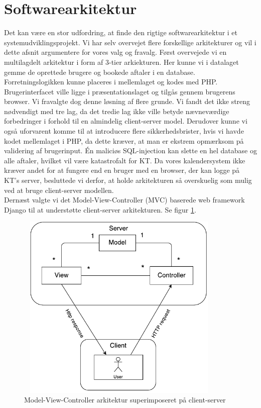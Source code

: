 \documentclass[12pt]{article}   %
\begin{document}
\section{Softwarearkitektur}
Det kan være en stor udfordring, at finde den rigtige softwarearkitektur i et
systemudviklingsprojekt. Vi har selv overvejet flere forskellige arkitekturer 
og vil i dette afsnit argumentere for vores valg og fravalg. Først overvejede
vi en multilagdelt arkitektur i form af 3-tier arkiekturen. Her kunne vi i
datalaget gemme de oprettede brugere og bookede aftaler i en database.
Forretningslogikken kunne placeres i mellemlaget og kodes med PHP.
Brugerinterfacet ville ligge i præsentationslaget og tilgås gennem brugerens
browser. Vi fravalgte dog denne løsning af flere grunde. Vi fandt det ikke
streng nødvendigt med tre lag, da det tredie lag ikke ville betyde
nævneværdige forbedringer i forhold til en almindelig client-server model.
Derudover kunne vi også uforvarent komme til at introducere flere
sikkerhedsbrister, hvis vi havde kodet mellemlaget i PHP, da dette kræver, at 
man er ekstrem opmærksom på validering af brugerinput. Én maliciøs SQL-injection
kan slette en hel database og alle aftaler, hvilket vil være katastrofalt for
KT. Da vores kalendersystem ikke kræver andet for at fungere end en bruger med
en browser, der kan logge på KT's server, besluttede vi derfor, at holde 
arkitekturen så overskuelig som mulig ved at bruge client-server modellen. \\
Dernæst valgte vi det Model-View-Controller (MVC) baserede web framework Django til
at understøtte client-server arkitekturen. Se figur \ref{fig:mvc}.\\

\begin{figure}[!ht]
	\centering
\includegraphics[width=10cm, height=9cm]{mvc.pdf}
\caption{Model-View-Controller arkitektur superimposeret på client-server}
\label{fig:mvc}
\end{figure}
\end{document}
